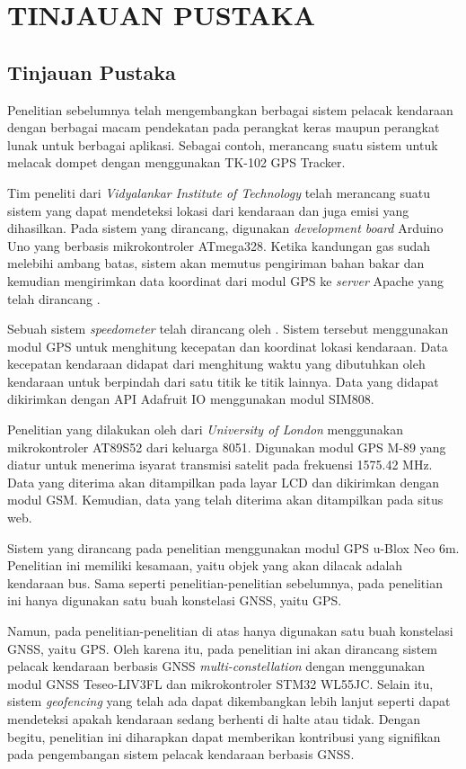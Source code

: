 \chapter{TINJAUAN PUSTAKA}

\section{Tinjauan Pustaka}
Penelitian sebelumnya telah mengembangkan berbagai sistem pelacak kendaraan dengan berbagai macam pendekatan pada perangkat keras maupun perangkat lunak untuk berbagai aplikasi. Sebagai contoh, \cite{Ekhsan2022} merancang suatu sistem untuk melacak dompet dengan menggunakan TK-102 GPS Tracker.

Tim peneliti dari \textit{Vidyalankar Institute of Technology} telah merancang suatu sistem yang dapat mendeteksi lokasi dari kendaraan dan juga emisi  yang dihasilkan. Pada sistem yang dirancang, digunakan \textit{development board} Arduino Uno yang berbasis mikrokontroler ATmega328. Ketika kandungan gas  sudah melebihi ambang batas, sistem akan memutus pengiriman bahan bakar dan kemudian mengirimkan data koordinat dari modul GPS ke \textit{server} Apache yang telah dirancang \cite{Asha2022}.

Sebuah sistem \textit{speedometer} telah dirancang oleh \cite{Najmurrokhman2021}. Sistem tersebut menggunakan modul GPS untuk menghitung kecepatan dan koordinat lokasi kendaraan. Data kecepatan kendaraan didapat dari menghitung waktu yang dibutuhkan oleh kendaraan untuk berpindah dari satu titik ke titik lainnya. Data yang didapat dikirimkan dengan API Adafruit IO menggunakan modul SIM808.

Penelitian yang dilakukan oleh \cite{Mukhtar2015} dari \textit{University of London} menggunakan mikrokontroler AT89S52 dari keluarga 8051. Digunakan modul GPS M-89 yang diatur untuk menerima isyarat transmisi satelit pada frekuensi 1575.42 MHz. Data yang diterima akan ditampilkan pada layar LCD dan dikirimkan dengan modul GSM. Kemudian, data yang telah diterima akan ditampilkan pada situs web.

Sistem yang dirancang pada penelitian \cite{Widya2016} menggunakan modul GPS u-Blox Neo 6m. Penelitian ini memiliki kesamaan, yaitu objek yang akan dilacak adalah kendaraan bus. Sama seperti penelitian-penelitian sebelumnya, pada penelitian ini hanya digunakan satu buah konstelasi GNSS, yaitu GPS.

Namun, pada penelitian-penelitian di atas hanya digunakan satu buah konstelasi GNSS, yaitu GPS. Oleh karena itu, pada penelitian ini akan dirancang sistem pelacak kendaraan berbasis GNSS \textit{multi-constellation} dengan menggunakan modul GNSS Teseo-LIV3FL dan mikrokontroler STM32 WL55JC. Selain itu, sistem \textit{geofencing} yang telah ada dapat dikembangkan lebih lanjut seperti dapat mendeteksi apakah kendaraan sedang berhenti di halte atau tidak. Dengan begitu, penelitian ini diharapkan dapat memberikan kontribusi yang signifikan pada pengembangan sistem pelacak kendaraan berbasis GNSS.


